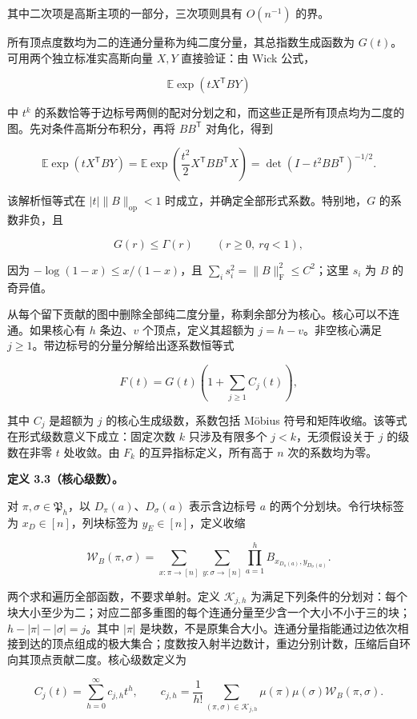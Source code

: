 \documentclass[11pt,a4paper]{article}
\begin{document}
其中二次项是高斯主项的一部分，三次项则具有 \(O(n^{-1})\) 的界。

所有顶点度数均为二的连通分量称为纯二度分量，其总指数生成函数为 \(G(t)\)。可用两个独立标准实高斯向量 \(X,Y\) 直接验证：由 Wick 公式，

\[
\mathbb E\exp(tX^{\mathsf T}BY)
\]

中 \(t^k\) 的系数恰等于边标号两侧的配对分划之和，而这些正是所有顶点均为二度的图。先对条件高斯分布积分，再将 \(BB^{\mathsf T}\) 对角化，得到

\[
\mathbb E\exp(tX^{\mathsf T}BY)
=\mathbb E\exp\!\left(\frac{t^2}{2}X^{\mathsf T}BB^{\mathsf T}X\right)
=\det(I-t^2BB^{\mathsf T})^{-1/2}.
\]

该解析恒等式在 \(|t|\|B\|_{\mathrm{op}}<1\) 时成立，并确定全部形式系数。特别地，\(G\) 的系数非负，且

\[
G(r)\le\Gamma(r)\qquad(r\ge0,\ rq<1),
\]

因为 \(-\log(1-x)\le x/(1-x)\)，且 \(\sum_i s_i^2=\|B\|_{\mathrm F}^2\le C^2\)；这里 \(s_i\) 为 \(B\) 的奇异值。

从每个留下贡献的图中删除全部纯二度分量，称剩余部分为核心。核心可以不连通。如果核心有 \(h\) 条边、\(v\) 个顶点，定义其超额为 \(j=h-v\)。非空核心满足 \(j\ge1\)。带边标号的分量分解给出逐系数恒等式

\[
F(t)=G(t)\left(1+\sum_{j\ge1}C_j(t)\right),
\]

其中 \(C_j\) 是超额为 \(j\) 的核心生成级数，系数包括 Möbius 符号和矩阵收缩。该等式在形式级数意义下成立：固定次数 \(k\) 只涉及有限多个 \(j<k\)，无须假设关于 \(j\) 的级数在非零 \(t\) 处收敛。由 \(F_k\) 的互异指标定义，所有高于 \(n\) 次的系数均为零。

\textbf{定义 3.3（核心级数）。}

对 \(\pi,\sigma\in\mathfrak P_h\)，以 \(D_\pi(a)\)、\(D_\sigma(a)\) 表示含边标号 \(a\) 的两个分划块。令行块标签为 \(x_D\in[n]\)，列块标签为 \(y_E\in[n]\)，定义收缩

\[
\mathcal W_B(\pi,\sigma)
=\sum_{x:\pi\to[n]}\sum_{y:\sigma\to[n]}
\prod_{a=1}^hB_{x_{D_\pi(a)},y_{D_\sigma(a)}}.
\]

两个求和遍历全部函数，不要求单射。定义 \(\mathcal K_{j,h}\) 为满足下列条件的分划对：每个块大小至少为二；对应二部多重图的每个连通分量至少含一个大小不小于三的块；\(h-|\pi|-|\sigma|=j\)。其中 \(|\pi|\) 是块数，不是原集合大小。连通分量指能通过边依次相接到达的顶点组成的极大集合；度数按入射半边数计，重边分别计数，压缩后自环向其顶点贡献二度。核心级数定义为

\[
C_j(t)=\sum_{h=0}^{\infty}c_{j,h}t^h,\qquad
c_{j,h}=\frac1{h!}\sum_{(\pi,\sigma)\in\mathcal K_{j,h}}
\mu(\pi)\mu(\sigma)\mathcal W_B(\pi,\sigma).
\]
\end{document}
